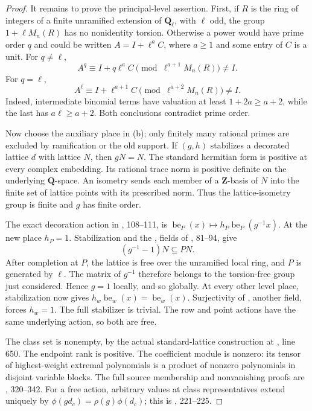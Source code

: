 \begin{proof}
It remains to prove the principal-level assertion.
First, if $R$ is the ring of integers of a finite unramified extension
of $\mathbf Q_\ell$, with $\ell$ odd, the group
$1+\ell M_n(R)$ has no nonidentity torsion.
Otherwise a power would have prime order $q$ and could be written
$A=I+\ell^aC$, where $a\ge1$ and some entry of $C$ is a unit.
For $q\ne\ell$,
\[
 A^q\equiv I+q\ell^aC\pmod{\ell^{a+1}M_n(R)}\ne I.
\]
For $q=\ell$,
\[
 A^\ell\equiv I+\ell^{a+1}C
                  \pmod{\ell^{a+2}M_n(R)}\ne I.
\]
Indeed, intermediate binomial terms have valuation at least
$1+2a\ge a+2$, while the last has $a\ell\ge a+2$.
Both conclusions contradict prime order.

Now choose the auxiliary place in (b); only finitely many rational primes
are excluded by ramification or the old support.
If $(g,h)$ stabilizes a decorated lattice $d$ with lattice $N$, then
$gN=N$.
The standard hermitian form is positive at every complex embedding.
Its rational trace norm is positive definite on the underlying
$\mathbf Q$-space.
An isometry sends each member of a $\mathbf Z$-basis of $N$ into the
finite set of lattice points with its prescribed norm.
Thus the lattice-isometry group is finite and $g$ has finite order.

The exact decoration action in , 108--111,
is $\operatorname{be}_P(x)\mapsto
h_P\operatorname{be}_P(g^{-1}x)$.
At the new place $h_P=1$.
Stabilization and the ,  fields of
, 81--94, give
\[
 (g^{-1}-1)N\subseteq PN.
\]
After completion at $P$, the lattice is free over the unramified local
ring, and $P$ is generated by $\ell$.
The matrix of $g^{-1}$ therefore belongs to the torsion-free group just
considered. Hence $g=1$ locally, and so globally.
At every other level place, stabilization now gives
$h_w\operatorname{be}_w(x)=\operatorname{be}_w(x)$.
Surjectivity of , another  field, forces
$h_w=1$. The full stabilizer is trivial.
The row and point actions have the same underlying action, so both
are free.

The class set is nonempty, by the actual standard-lattice construction
 at , line 650.
The endpoint rank is positive.
The coefficient module is nonzero: its tensor of highest-weight
extremal polynomials is a product of nonzero polynomials in disjoint
variable blocks. The full source membership and nonvanishing proofs
are , 320--342.
For a free action, arbitrary values at class representatives extend
uniquely by $\phi(gd_c)=\rho(g)\phi(d_c)$;
this is , 221--225.


\end{proof}

